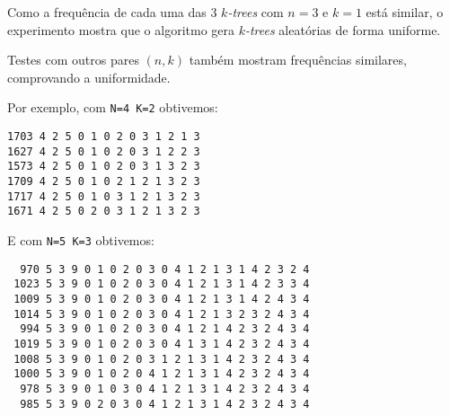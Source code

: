 Como a frequência de cada uma das $3$ \emph{$k$-trees} com $n = 3$ e $k = 1$ está similar, o experimento mostra que o algoritmo gera \emph{$k$-trees} aleatórias de forma uniforme.

Testes com outros pares $(n, k)$ também mostram frequências similares, comprovando a uniformidade.

\vspace{1em}

Por exemplo, com {\tt N=4 K=2} obtivemos:

\begin{lstlisting}
1703 4 2 5 0 1 0 2 0 3 1 2 1 3
1627 4 2 5 0 1 0 2 0 3 1 2 2 3
1573 4 2 5 0 1 0 2 0 3 1 3 2 3
1709 4 2 5 0 1 0 2 1 2 1 3 2 3
1717 4 2 5 0 1 0 3 1 2 1 3 2 3
1671 4 2 5 0 2 0 3 1 2 1 3 2 3
\end{lstlisting}


\vspace{1em}

E com {\tt N=5 K=3} obtivemos:

\begin{lstlisting}
  970 5 3 9 0 1 0 2 0 3 0 4 1 2 1 3 1 4 2 3 2 4
 1023 5 3 9 0 1 0 2 0 3 0 4 1 2 1 3 1 4 2 3 3 4
 1009 5 3 9 0 1 0 2 0 3 0 4 1 2 1 3 1 4 2 4 3 4
 1014 5 3 9 0 1 0 2 0 3 0 4 1 2 1 3 2 3 2 4 3 4
  994 5 3 9 0 1 0 2 0 3 0 4 1 2 1 4 2 3 2 4 3 4
 1019 5 3 9 0 1 0 2 0 3 0 4 1 3 1 4 2 3 2 4 3 4
 1008 5 3 9 0 1 0 2 0 3 1 2 1 3 1 4 2 3 2 4 3 4
 1000 5 3 9 0 1 0 2 0 4 1 2 1 3 1 4 2 3 2 4 3 4
  978 5 3 9 0 1 0 3 0 4 1 2 1 3 1 4 2 3 2 4 3 4
  985 5 3 9 0 2 0 3 0 4 1 2 1 3 1 4 2 3 2 4 3 4
\end{lstlisting}


%
%
%


